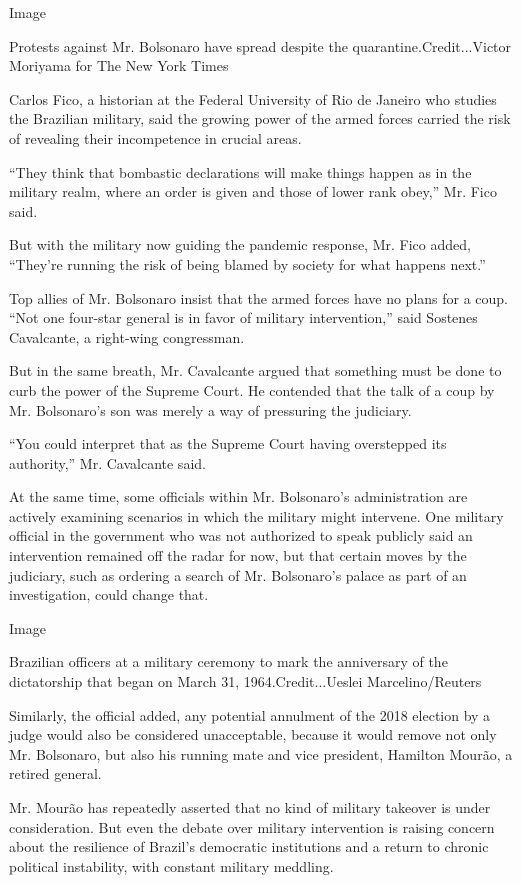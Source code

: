 Image

Protests against Mr. Bolsonaro have spread despite the
quarantine.Credit...Victor Moriyama for The New York Times

Carlos Fico, a historian at the Federal University of Rio de Janeiro who
studies the Brazilian military, said the growing power of the armed
forces carried the risk of revealing their incompetence in crucial
areas.

``They think that bombastic declarations will make things happen as in
the military realm, where an order is given and those of lower rank
obey,'' Mr. Fico said.

But with the military now guiding the pandemic response, Mr. Fico added,
``They're running the risk of being blamed by society for what happens
next.''

Top allies of Mr. Bolsonaro insist that the armed forces have no plans
for a coup. ``Not one four-star general is in favor of military
intervention,'' said Sostenes Cavalcante, a right-wing congressman.

But in the same breath, Mr. Cavalcante argued that something must be
done to curb the power of the Supreme Court. He contended that the talk
of a coup by Mr. Bolsonaro's son was merely a way of pressuring the
judiciary.

``You could interpret that as the Supreme Court having overstepped its
authority,'' Mr. Cavalcante said.

At the same time, some officials within Mr. Bolsonaro's administration
are actively examining scenarios in which the military might intervene.
One military official in the government who was not authorized to speak
publicly said an intervention remained off the radar for now, but that
certain moves by the judiciary, such as ordering a search of Mr.
Bolsonaro's palace as part of an investigation, could change that.

Image

Brazilian officers at a military ceremony to mark the anniversary of the
dictatorship that began on March 31, 1964.Credit...Ueslei
Marcelino/Reuters

Similarly, the official added, any potential annulment of the 2018
election by a judge would also be considered unacceptable, because it
would remove not only Mr. Bolsonaro, but also his running mate and vice
president, Hamilton Mourão, a retired general.

Mr. Mourão has repeatedly asserted that no kind of military takeover is
under consideration. But even the debate over military intervention is
raising concern about the resilience of Brazil's democratic institutions
and a return to chronic political instability, with constant military
meddling.

